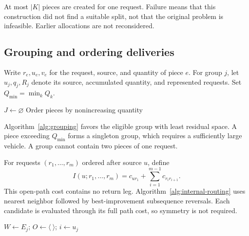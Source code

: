 At most $|K|$ pieces are created for one request. Failure means that this
construction did not find a suitable split, not that the original problem is
infeasible. Earlier allocations are not reconsidered.

\subsection{Grouping and ordering deliveries}
Write $r_e,u_e,v_e$ for the request, source, and quantity of piece $e$.
For group $j$, let $u_j,q_j,R_j$ denote its source, accumulated quantity, and
represented requests. Set $Q_{\min}=\min_kQ_k$.

\begin{algorithm}[htbp]
\SetAlgoLined
{}
$J\gets\varnothing$\;
Order pieces by nonincreasing quantity\;
\;
\caption{Best-fit grouping of delivery pieces}\label{alg:grouping}
\end{algorithm}

Algorithm~\ref{alg:grouping} favors the eligible group with least residual
space. A piece exceeding $Q_{\min}$ forms a singleton group, which requires
a sufficiently large vehicle. A group cannot contain two pieces of one request.

For requests $(r_1,\ldots,r_m)$ ordered after source $u$, define
\[
I(u;r_1,\ldots,r_m)=c_{ur_1}+\sum_{i=1}^{m-1}c_{r_ir_{i+1}}.
\]
This open-path cost contains no return leg. Algorithm~\ref{alg:internal-routing}
uses nearest neighbor followed by best-improvement subsequence reversals.
Each candidate is evaluated through its full path cost, so symmetry is not
required.

\begin{algorithm}[htbp]
\SetAlgoLined
{}
$W\gets E_j$; $O\gets\langle\ \rangle$; $i\gets u_j$\;
\;
\caption{Internal delivery ordering}\label{alg:internal-routing}
\end{algorithm}

